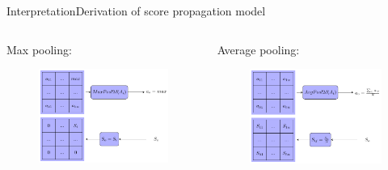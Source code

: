 \documentclass{beamer}
\begin{document}
\begin{frame}{Interpretation}{Derivation of score propagation model}
\begin{columns}
	\begin{column}{0.5\textwidth}
		\alert{Max pooling:}
		\begin{figure}
			\centering
		\includegraphics[scale=0.55]{./chapter_interpretation/score_maxpool.pdf}
		\end{figure}
	\end{column}
	\begin{column}{0.5\textwidth}
		\alert{Average pooling:}
		\begin{figure}
			\centering
		\includegraphics[scale=0.55]{./chapter_interpretation/score_avgpool.pdf}
		\end{figure}		
	\end{column}
\end{columns}
\end{frame}
\end{document}

